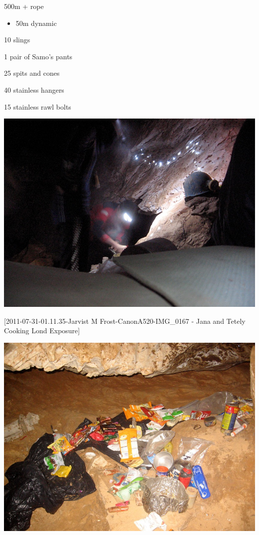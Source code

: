 500m + rope

\begin{itemize}
\tightlist
\item
  50m dynamic
\end{itemize}

10 slings

1 pair of Samo's pants

25 spits and cones

40 stainless hangers

15 stainless rawl bolts

\includegraphics{UgLog1012/58.png}

{[}2011-07-31-01.11.35-Jarvist M Frost-CanonA520-IMG\_0167 - Jana and
Tetely Cooking Lond Exposure{]}

\includegraphics{UgLog1012/59.png}

